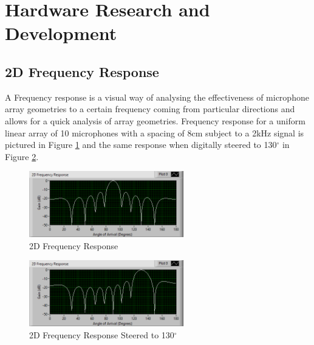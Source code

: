 \documentclass{UoNMCHA}
\numberwithin{equation}{section}
\begin{document}
\newpage
\section{Hardware Research and Development} \label{sec:Hardware}
\subsection{2D Frequency Response} \label{sec:2D Freq Response}
    A Frequency response is a visual way of analysing the effectiveness of microphone array geometries to a certain frequency coming from particular directions and allows for a quick analysis of array geometries. Frequency response for a uniform linear array of 10 microphones with a spacing of $8$cm subject to a 2kHz signal is pictured in Figure \ref{fig:2DFreqResponseLin} and the same response when digitally steered to 130$^{\circ}$ in Figure \ref{fig:2DResponseSteered}.
    
    \begin{figure}[H]
        \centering
        \includegraphics[keepaspectratio, width = 0.6\textwidth]{Figures/FrequencyResponse2K10Lin.png}
        \caption{2D Frequency Response}
        \label{fig:2DFreqResponseLin}
    \end{figure}
    \begin{figure}[H]
        \centering
        \includegraphics[keepaspectratio, width = 0.6\textwidth]{Figures/2DResponseSteered.png}
        \caption{2D Frequency Response Steered to 130$^{\circ}$}
        \label{fig:2DResponseSteered}
    \end{figure}
    
\end{document}
